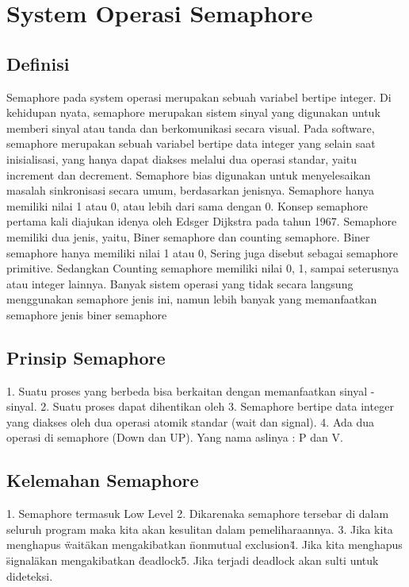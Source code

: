 \section{System Operasi Semaphore}
\subsection{Definisi}
Semaphore pada system operasi merupakan sebuah variabel bertipe integer. Di kehidupan nyata, semaphore merupakan sistem sinyal yang
digunakan untuk memberi sinyal atau tanda dan berkomunikasi secara visual. Pada software, semaphore merupakan sebuah variabel bertipe data
integer yang selain saat inisialisasi, yang hanya dapat diakses melalui dua operasi standar, yaitu increment dan decrement. Semaphore bias
digunakan untuk menyelesaikan masalah sinkronisasi secara umum, berdasarkan jenisnya. Semaphore hanya memiliki nilai 1 atau 0, atau lebih
dari sama dengan 0. Konsep semaphore pertama kali diajukan idenya oleh Edsger Dijkstra pada tahun 1967. Semaphore memiliki dua jenis,
yaitu, Biner semaphore dan counting semaphore. Biner semaphore hanya memiliki nilai 1 atau 0, Sering juga disebut sebagai semaphore
primitive. Sedangkan Counting semaphore memiliki nilai 0, 1, sampai seterusnya atau integer lainnya. Banyak sistem operasi yang tidak
secara langsung menggunakan semaphore jenis ini, namun lebih banyak yang memanfaatkan semaphore jenis biner semaphore

\subsection{Prinsip Semaphore}
1. Suatu proses yang berbeda bisa berkaitan dengan memanfaatkan sinyal - sinyal.
2. Suatu proses dapat dihentikan oleh 
3. Semaphore bertipe data integer yang diakses oleh dua operasi atomik standar (wait dan signal).
4. Ada dua operasi di semaphore (Down dan UP). Yang nama aslinya : P dan V.

\subsection{Kelemahan Semaphore}
1. Semaphore termasuk Low Level
2. Dikarenaka semaphore tersebar di dalam seluruh program maka kita akan kesulitan dalam pemeliharaannya.
3. Jika kita menghapus \"wait\" akan mengakibatkan \"nonmutual exclusion\"
4. Jika kita menghapus \"signal\" akan mengakibatkan \"deadlock\"
5. Jika terjadi deadlock akan sulti untuk dideteksi.
